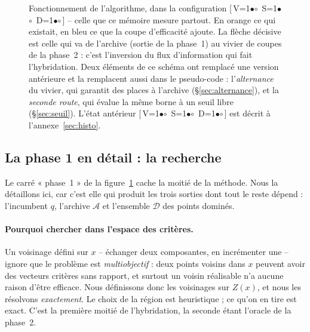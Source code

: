 \documentclass[11pt,a4paper]{article}
\theoremstyle{plain}
\theoremstyle{remark}
\newcommand{\Acal}{\mathcal{A}}
\newcommand{\cfgm}[1]{\ifnum#1=1$\bullet$\else$\circ$\fi}
\newcommand{\conf}[3]{%
  \textsf{\footnotesize[\,V\cfgm{#1}\ S\cfgm{#2}\ D\cfgm{#3}\,]}}
\begin{document}
\begin{figure}[H]
{}
\caption{Fonctionnement de l'algorithme, dans la configuration
\conf{1}{1}{1} -- celle que ce mémoire mesure partout. En
\textcolor{cdom}{orange} ce qui existait, en \textcolor{ceff}{bleu} ce que la
coupe d'efficacité ajoute. La flèche décisive est celle qui va de l'archive
(sortie de la phase~1) au vivier de coupes de la phase~2 : c'est l'inversion
du flux d'information qui fait l'hybridation. Deux éléments de ce schéma ont
remplacé une version antérieure et la remplacent aussi dans le
pseudo-code : l'\emph{alternance} du vivier, qui garantit des places à
l'archive (\S\ref{sec:alternance}), et la \emph{seconde route}, qui évalue la
même borne à un seuil libre (\S\ref{sec:seuil}). L'état antérieur
\conf{0}{0}{0} est décrit à l'annexe~\ref{sec:histo}.}
\label{fig:flow}
\end{figure}

\subsection{La phase 1 en détail : la recherche}
\label{sec:recherche}

Le carré « phase~1 » de la figure~\ref{fig:flow} cache la moitié de la
méthode. Nous la détaillons ici, car c'est elle qui produit les trois
sorties dont tout le reste dépend : l'incumbent $q$, l'archive $\Acal$ et
l'ensemble $\mathcal{D}$ des points dominés.

\paragraph{Pourquoi chercher dans l'espace des critères.} Un voisinage
défini sur $x$ -- échanger deux composantes, en incrémenter une -- ignore
que le problème est \emph{multiobjectif} : deux points voisins dans $x$
peuvent avoir des vecteurs critères sans rapport, et surtout un voisin
réalisable n'a aucune raison d'être efficace. Nous définissons donc les
voisinages sur $Z(x)$, et nous les résolvons \emph{exactement}. Le choix de
la région est heuristique ; ce qu'on en tire est exact. C'est la première
moitié de l'hybridation, la seconde étant l'oracle de la phase~2.
\end{document}
